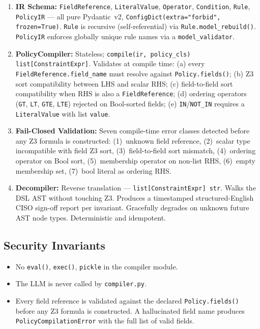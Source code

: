 \documentclass[12pt,a4paper,oneside]{report}
\newcommand{\code}[1]{\texttt{#1}}           %
\begin{document}
\begin{enumerate}
  \item \textbf{IR Schema:} \code{FieldReference}, \code{LiteralValue},
        \code{Operator}, \code{Condition}, \code{Rule}, \code{PolicyIR} ---
        all pure Pydantic~v2, \code{ConfigDict(extra="forbid", frozen=True)}.
        \code{Rule} is recursive (self-referential) via
        \code{Rule.model\_rebuild()}.  \code{PolicyIR} enforces globally
        unique rule names via a \code{model\_validator}.

  \item \textbf{PolicyCompiler:} Stateless;
        \code{compile(ir, policy\_cls) \to list[ConstraintExpr]}.
        Validates at compile time: (a) every \code{FieldReference.field\_name}
        must resolve against \code{Policy.fields()}; (b) Z3 sort
        compatibility between LHS and scalar RHS; (c) field-to-field sort
        compatibility when RHS is also a \code{FieldReference}; (d) ordering
        operators (\code{GT}, \code{LT}, \code{GTE}, \code{LTE}) rejected on
        Bool-sorted fields; (e) \code{IN}/\code{NOT\_IN} requires a
        \code{LiteralValue} with list \code{value}.

  \item \textbf{Fail-Closed Validation:} Seven compile-time error classes
        detected before any Z3 formula is constructed:
        (1)~unknown field reference,
        (2)~scalar type incompatible with field Z3 sort,
        (3)~field-to-field sort mismatch,
        (4)~ordering operator on Bool sort,
        (5)~membership operator on non-list RHS,
        (6)~empty membership set,
        (7)~bool literal as ordering RHS.

  \item \textbf{Decompiler:} Reverse translation ---
        \code{list[ConstraintExpr] \to str}.  Walks the DSL AST without
        touching Z3.  Produces a timestamped structured-English CISO sign-off
        report per invariant.  Gracefully degrades on unknown future AST node
        types.  Deterministic and idempotent.
\end{enumerate}

\subsection{Security Invariants}

\begin{itemize}
  \item No \code{eval()}, \code{exec()}, \code{pickle} in the compiler module.
  \item The LLM is never called by \code{compiler.py}.
  \item Every field reference is validated against the declared
        \code{Policy.fields()} before any Z3 formula is constructed.  A
        hallucinated field name produces \code{PolicyCompilationError} with
        the full list of valid fields.
\end{itemize}
\end{document}
